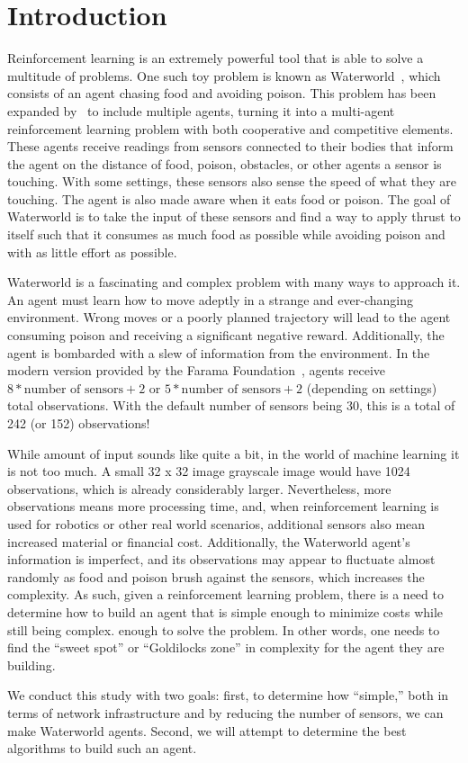 \section{Introduction}\label{sec:introduction}
Reinforcement learning is an extremely powerful tool that is able to solve a multitude
of problems.
One such toy problem is known as Waterworld~\cite{Karpathy2015, Ho2016}, which consists
of an agent chasing food and avoiding poison.
This problem has been expanded by~\cite{Gupta2017} to include multiple agents,
turning it into a multi-agent reinforcement learning problem with both cooperative
and competitive elements.
These agents receive readings from sensors connected to their bodies that
inform the agent on the distance of food, poison, obstacles, or other agents a sensor
is touching.
With some settings, these sensors also sense the speed of what they are touching.
The agent is also made aware when it eats food or poison.
The goal of Waterworld is to take the input of these sensors and find a way to apply
thrust to itself such that it consumes as much food as possible while avoiding poison
and with as little effort as possible.

Waterworld is a fascinating and complex problem with many ways to approach it.
An agent must learn how to move adeptly in a strange and ever-changing environment.
Wrong moves or a poorly planned trajectory will lead to the agent consuming poison
and receiving a significant negative reward.
Additionally, the agent is bombarded with a slew of information from the environment.
In the modern version provided by the Farama Foundation~\cite{WaterworldDocumentation},
agents receive $8 * \text{number of sensors} + 2$ or
$5 * \text{number of sensors} + 2$ (depending on settings) total observations.
With the default number of sensors being 30, this is a total of 242 (or 152)
observations!

While amount of input sounds like quite a bit, in the world of machine learning it is
not too much.
A small 32 x 32 image grayscale image would have 1024 observations, which is already
considerably larger.
Nevertheless, more observations means more processing time, and, when reinforcement
learning is used for robotics or other real world scenarios, additional sensors also
mean increased material or financial cost.
Additionally, the Waterworld agent's information is imperfect, and its observations
may appear to fluctuate almost randomly as food and poison brush against the sensors,
which increases the complexity.
As such, given a reinforcement learning problem, there is a need to determine how to
build an agent that is simple enough to minimize costs while still being complex.
enough to solve the problem.
In other words, one needs to find the ``sweet spot'' or ``Goldilocks zone'' in
complexity for the agent they are building.

We conduct this study with two goals: first, to determine how ``simple,'' both in
terms of network infrastructure and by reducing the number of sensors, we can make
Waterworld agents.
Second, we will attempt to determine the best algorithms to build such an agent.
